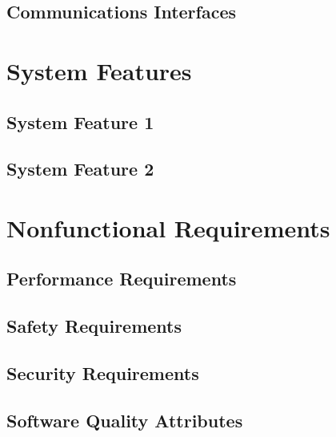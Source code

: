 \documentclass{article}
\begin{document}
\subsection{Communications Interfaces}

\newpage
\section{System Features}
\subsection{System Feature 1}

\subsection{System Feature 2}


\newpage
\section{Nonfunctional Requirements}
\subsection{Performance Requirements}

\subsection{Safety Requirements}

\subsection{Security Requirements}

\subsection{Software Quality Attributes}
\end{document}

